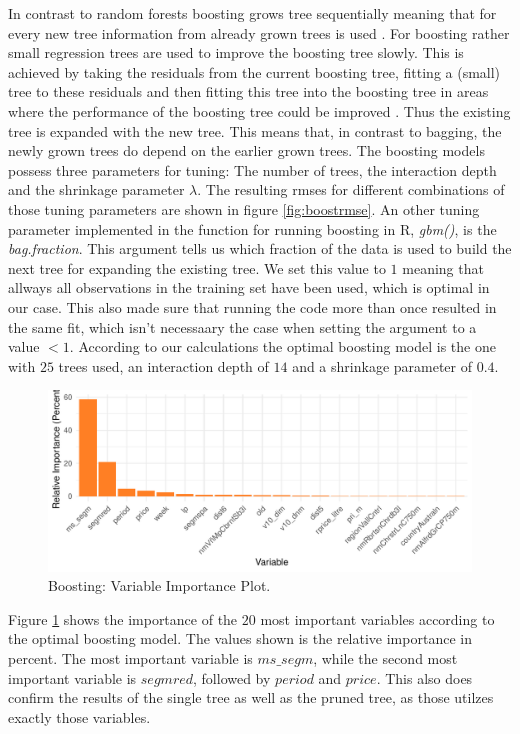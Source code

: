 \documentclass[11pt,]{article}
\begin{document}
In contrast to random forests boosting grows tree sequentially meaning
that for every new tree information from already grown trees is used
\autocite[cf.][p. 322]{James2014}. For boosting rather small regression
trees are used to improve the boosting tree slowly. This is achieved by
taking the residuals from the current boosting tree, fitting a (small)
tree to these residuals and then fitting this tree into the boosting
tree in areas where the performance of the boosting tree could be
improved \autocite[cf.][p. 322]{James2014}. Thus the existing tree is
expanded with the new tree. This means that, in contrast to bagging, the
newly grown trees do depend on the earlier grown trees. The boosting
models possess three parameters for tuning: The number of trees, the
interaction depth and the shrinkage parameter \(\lambda\). The resulting
\ac{rmse}s for different combinations of those tuning parameters are
shown in figure \ref{fig:boostrmse}. An other tuning parameter
implemented in the function for running boosting in R, \emph{gbm()}, is
the \emph{bag.fraction}. This argument tells us which fraction of the
data is used to build the next tree for expanding the existing tree. We
set this value to \(1\) meaning that allways all observations in the
training set have been used, which is optimal in our case. This also
made sure that running the code more than once resulted in the same fit,
which isn't necessaary the case when setting the argument to a value
\(< 1\). According to our calculations the optimal boosting model is the
one with \(25\) trees used, an interaction depth of \(14\) and a
shrinkage parameter of \(0.4\).

\begin{figure}
\centering
\includegraphics{../00_data/output_paper/12_var_imp_boosting_bp.pdf}
\caption{\label{fig:boostimp}Boosting: Variable Importance Plot.}
\end{figure}

Figure \ref{fig:boostimp} shows the importance of the \(20\) most
important variables according to the optimal boosting model. The values
shown is the relative importance in percent. The most important variable
is \(ms\_segm\), while the second most important variable is
\(segmred\), followed by \(period\) and \(price\). This also does
confirm the results of the single tree as well as the pruned tree, as
those utilzes exactly those variables.
\end{document}
